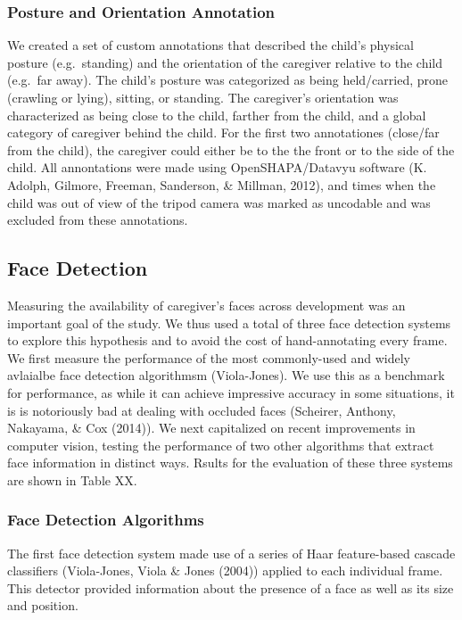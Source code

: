 \documentclass[10pt, letterpaper]{article}
\begin{document}
\subsubsection{Posture and Orientation
Annotation}\label{posture-and-orientation-annotation}

We created a set of custom annotations that described the child's
physical posture (e.g.~standing) and the orientation of the caregiver
relative to the child (e.g.~far away). The child's posture was
categorized as being held/carried, prone (crawling or lying), sitting,
or standing. The caregiver's orientation was characterized as being
close to the child, farther from the child, and a global category of
caregiver behind the child. For the first two annotationes (close/far
from the child), the caregiver could either be to the the front or to
the side of the child. All annontations were made using
OpenSHAPA/Datavyu software (K. Adolph, Gilmore, Freeman, Sanderson, \&
Millman, 2012), and times when the child was out of view of the tripod
camera was marked as uncodable and was excluded from these annotations.

\subsection{Face Detection}\label{face-detection}

Measuring the availability of caregiver's faces across development was
an important goal of the study. We thus used a total of three face
detection systems to explore this hypothesis and to avoid the cost of
hand-annotating every frame. We first measure the performance of the
most commonly-used and widely avlaialbe face detection algorithmsm
(Viola-Jones). We use this as a benchmark for performance, as while it
can achieve impressive accuracy in some situations, it is is notoriously
bad at dealing with occluded faces (Scheirer, Anthony, Nakayama, \& Cox
(2014)). We next capitalized on recent improvements in computer vision,
testing the performance of two other algorithms that extract face
information in distinct ways. Rsults for the evaluation of these three
systems are shown in Table XX.

\subsubsection{Face Detection
Algorithms}\label{face-detection-algorithms}

The first face detection system made use of a series of Haar
feature-based cascade classifiers (Viola-Jones, Viola \& Jones (2004))
applied to each individual frame. This detector provided information
about the presence of a face as well as its size and position.
\end{document}
